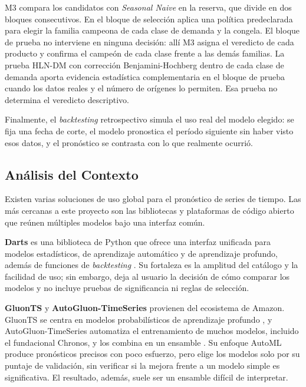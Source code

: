 M3 compara los candidatos con \textit{Seasonal Naive} en la reserva, que divide en dos bloques consecutivos. En el bloque de selección aplica una política predeclarada para elegir la familia campeona de cada clase de demanda y la congela. El bloque de prueba no interviene en ninguna decisión: allí M3 asigna el veredicto de cada producto y confirma el campeón de cada clase frente a las demás familias. La prueba HLN-DM \cite{dm,harvey1997} con corrección Benjamini-Hochberg dentro de cada clase de demanda \cite{benjamini1995} aporta evidencia estadística complementaria en el bloque de prueba cuando los datos reales y el número de orígenes lo permiten. Esa prueba no determina el veredicto descriptivo.

Finalmente, el \textit{backtesting} retrospectivo simula el uso real del modelo elegido: se fija una fecha de corte, el modelo pronostica el período siguiente sin haber visto esos datos, y el pronóstico se contrasta con lo que realmente ocurrió.



\subsection{Análisis del Contexto}

Existen varias soluciones de uso global para el pronóstico de series de tiempo. Las más cercanas a este proyecto son las bibliotecas y plataformas de código abierto que reúnen múltiples modelos bajo una interfaz común.

\textbf{Darts} es una biblioteca de Python que ofrece una interfaz unificada para modelos estadísticos, de aprendizaje automático y de aprendizaje profundo, además de funciones de \textit{backtesting} \cite{darts}. Su fortaleza es la amplitud del catálogo y la facilidad de uso; sin embargo, deja al usuario la decisión de cómo comparar los modelos y no incluye pruebas de significancia ni reglas de selección.

\textbf{GluonTS} y \textbf{AutoGluon-TimeSeries} provienen del ecosistema de Amazon. GluonTS se centra en modelos probabilísticos de aprendizaje profundo \cite{gluonts}, y AutoGluon-TimeSeries automatiza el entrenamiento de muchos modelos, incluido el fundacional Chronos, y los combina en un ensamble \cite{autogluon,chronos}. Su enfoque AutoML produce pronósticos precisos con poco esfuerzo, pero elige los modelos solo por su puntaje de validación, sin verificar si la mejora frente a un modelo simple es significativa. El resultado, además, suele ser un ensamble difícil de interpretar.

